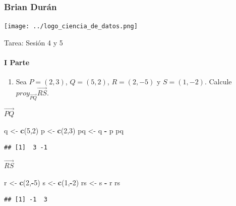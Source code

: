 \documentclass[]{article}
\title{}
\author{}
\date{}
\newenvironment{Shaded}{\begin{snugshade}}{\end{snugshade}}
\newcommand{\DecValTok}[1]{\textcolor[rgb]{0.00,0.00,0.81}{#1}}
\newcommand{\KeywordTok}[1]{\textcolor[rgb]{0.13,0.29,0.53}{\textbf{#1}}}
\newcommand{\NormalTok}[1]{#1}
\newcommand{\OperatorTok}[1]{\textcolor[rgb]{0.81,0.36,0.00}{\textbf{#1}}}
\newcommand{\StringTok}[1]{\textcolor[rgb]{0.31,0.60,0.02}{#1}}
\providecommand{\tightlist}{%
  \setlength{\itemsep}{0pt}\setlength{\parskip}{0pt}}
\let\oldparagraph\paragraph
\renewcommand{\paragraph}[1]{\oldparagraph{#1}\mbox{}}
\begin{document}
\hypertarget{brian-duran}{%
\subsubsection{Brian Durán}\label{brian-duran}}

\texttt{[image: ../logo\_ciencia\_de\_datos.png]}

Tarea: Sesión 4 y 5

\hypertarget{i-parte}{%
\paragraph{I Parte}\label{i-parte}}

\begin{enumerate}
\def\labelenumi{\arabic{enumi}.}
\tightlist
\item
  Sea \(P=(2,3)\), \(Q=(5,2)\), \(R=(2,-5)\) y \(S=(1,-2)\). Calcule
  \(proy_{\vec{PQ}}\vec{RS}\).
\end{enumerate}

\(\vec{PQ}\)

\begin{Shaded}
\begin{Highlighting}[]
\NormalTok{q <-}\StringTok{ }\KeywordTok{c}\NormalTok{(}\DecValTok{5}\NormalTok{,}\DecValTok{2}\NormalTok{)}
\NormalTok{p <-}\StringTok{ }\KeywordTok{c}\NormalTok{(}\DecValTok{2}\NormalTok{,}\DecValTok{3}\NormalTok{)}
\NormalTok{pq <-}\StringTok{ }\NormalTok{q }\OperatorTok{-}\StringTok{ }\NormalTok{p}
\NormalTok{pq}
\end{Highlighting}
\end{Shaded}

\begin{verbatim}
## [1]  3 -1
\end{verbatim}

\(\vec{RS}\)

\begin{Shaded}
\begin{Highlighting}[]
\NormalTok{r <-}\StringTok{ }\KeywordTok{c}\NormalTok{(}\DecValTok{2}\NormalTok{,}\OperatorTok{-}\DecValTok{5}\NormalTok{)}
\NormalTok{s <-}\StringTok{ }\KeywordTok{c}\NormalTok{(}\DecValTok{1}\NormalTok{,}\OperatorTok{-}\DecValTok{2}\NormalTok{)}
\NormalTok{rs <-}\StringTok{ }\NormalTok{s }\OperatorTok{-}\StringTok{ }\NormalTok{r}
\NormalTok{rs}
\end{Highlighting}
\end{Shaded}

\begin{verbatim}
## [1] -1  3
\end{verbatim}
\end{document}
